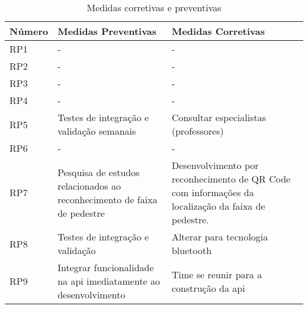 \begin{table}[ht]
    \centering
    \caption{Medidas corretivas e preventivas}
    \begin{tabular}{p{0.5in}p{2.3in}p{2.3in}}
    Número & Medidas Preventivas & Medidas Corretivas \\ \hline
    RP1 & - & - \\ \hline
    RP2 & - & - \\ \hline
    RP3 & - & - \\ \hline
    RP4 & - & - \\ \hline
    RP5 & Testes de integração e validação semanais & Consultar especialistas (professores) \\ \hline
    RP6 & - & - \\ \hline
    RP7 & Pesquisa de estudos relacionados ao reconhecimento de faixa de pedestre & Desenvolvimento por reconhecimento de QR Code com informações da localização da faixa de pedestre. \\ \hline
    RP8 & Testes de integração e validação & Alterar para tecnologia bluetooth \\ \hline
    RP9 & Integrar funcionalidade na api imediatamente ao desenvolvimento & Time se reunir para a construção da api \\ \hline
    \end{tabular}
\end{table}